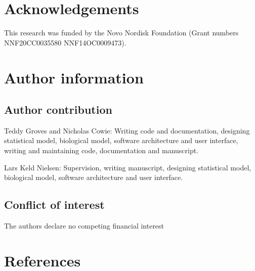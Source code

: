 \documentclass[journal=asbcd6,manuscript=article,layout=traditional]{achemso}
\begin{document}
\section{Acknowledgements}\label{acknowledgements}

This research was funded by the Novo Nordisk Foundation (Grant numbers
NNF20CC0035580 NNF14OC0009473).

\section{Author information}\label{author-information}

\subsection{Author contribution}\label{author-contribution}

Teddy Groves and Nicholas Cowie: Writing code and documentation,
designing statistical model, biological model, software architecture and
user interface, writing and maintaining code, documentation and
manuscript.

Lars Keld Nielsen: Supervision, writing manuscript, designing
statistical model, biological model, software architecture and user
interface.

\subsection{Conflict of interest}\label{conflict-of-interest}

The authors declare no competing financial interest

\section{References}\label{references}

\renewcommand{\bibsection}{}

\end{document}
